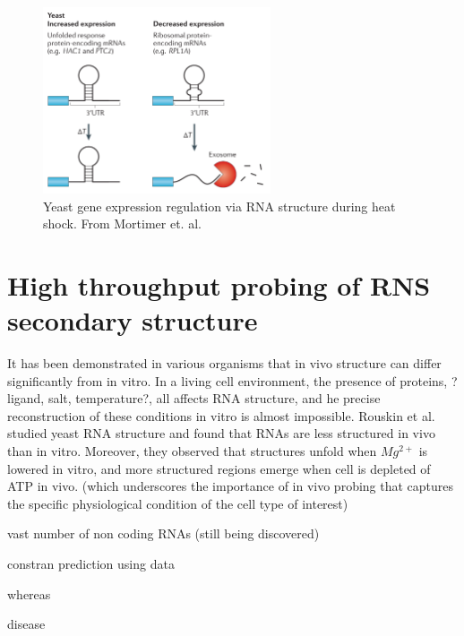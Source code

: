 \documentclass{proposal}
\begin{document}
\begin{figure}[h!]
    \centering
    \includegraphics[width=0.6\textwidth]{yeast_stability.png}
    \caption{Yeast gene expression regulation via RNA structure during heat shock. From Mortimer et. al\cite{mortimer2014insights}.}
    \label{fig:yeast_stability}
    \centering
\end{figure}


\section{High throughput probing of RNS secondary structure}


It has been demonstrated in various organisms that in vivo structure can differ significantly from in vitro.
In a living cell environment, the presence of proteins,  ?ligand, salt, temperature?, all affects RNA structure,
and he precise reconstruction of these conditions in vitro is almost impossible.
﻿Rouskin et al.\cite{rouskin2014genome} studied yeast RNA structure and found that RNAs are less structured in vivo than in vitro.
Moreover, they observed that structures unfold when $Mg^{2+}$ is lowered in vitro,
and more structured regions emerge when cell is depleted of ATP in vivo.
(which underscores the importance of in vivo probing that captures the specific physiological condition of the cell type of interest)


vast number of non coding RNAs (still being discovered)

constran prediction using data

whereas

disease

%
%
%
%
%
%
%
%
%
%
%
%
%
%
\end{document}
